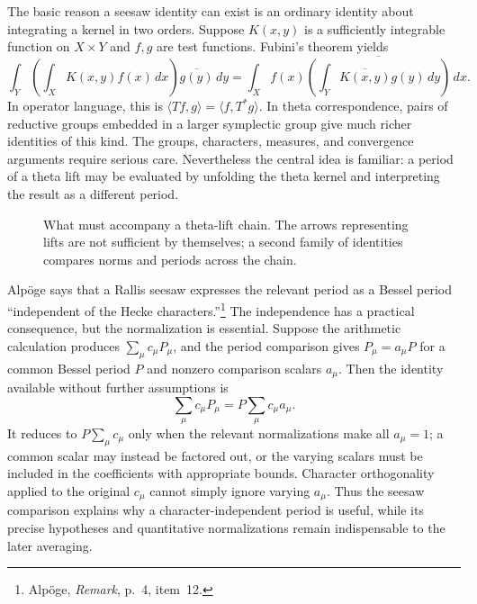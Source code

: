 \documentclass[11pt,openany,oneside]{scrbook}
\theoremstyle{definition}
\theoremstyle{remark}
\begin{document}
The basic reason a seesaw identity can exist is an ordinary identity about integrating a kernel in two orders. Suppose $K(x,y)$ is a sufficiently integrable function on $X\times Y$ and $f,g$ are test functions. Fubini's theorem yields
\[
\int_Y\left(\int_X K(x,y)f(x)\,dx\right)\overline{g(y)}\,dy
=
\int_X f(x)\overline{\left(\int_Y\overline{K(x,y)}g(y)\,dy\right)}\,dx.
\]
In operator language, this is $\langle Tf,g\rangle=\langle f,T^*g\rangle$. In theta correspondence, pairs of reductive groups embedded in a larger symplectic group give much richer identities of this kind. The groups, characters, measures, and convergence arguments require serious care. Nevertheless the central idea is familiar: a period of a theta lift may be evaluated by unfolding the theta kernel and interpreting the result as a different period.

\begin{figure}[ht]
\centering
{}
\caption{What must accompany a theta-lift chain. The arrows representing lifts are not sufficient by themselves; a second family of identities compares norms and periods across the chain.}
\end{figure}

Alp\"oge says that a Rallis seesaw expresses the relevant period as a Bessel period ``independent of the Hecke characters.''\footnote{Alp\"oge, \emph{Remark}, p.~4, item~12.} The independence has a practical consequence, but the normalization is essential. Suppose the arithmetic calculation produces $\sum_\mu c_\mu P_\mu$, and the period comparison gives $P_\mu=a_\mu P$ for a common Bessel period $P$ and nonzero comparison scalars $a_\mu$. Then the identity available without further assumptions is
\[
\sum_\mu c_\mu P_\mu=P\sum_\mu c_\mu a_\mu.
\]
It reduces to $P\sum_\mu c_\mu$ only when the relevant normalizations make all $a_\mu=1$; a common scalar may instead be factored out, or the varying scalars must be included in the coefficients with appropriate bounds. Character orthogonality applied to the original $c_\mu$ cannot simply ignore varying $a_\mu$. Thus the seesaw comparison explains why a character-independent period is useful, while its precise hypotheses and quantitative normalizations remain indispensable to the later averaging.
\end{document}
